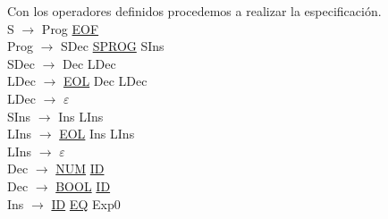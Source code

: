 \documentclass[\main/MemoriaPL.tex]{subfiles}
\begin{document}
    \par
    Con los operadores definidos procedemos a realizar la especificación.\\
    \vspace{2mm}
    S $\rightarrow$ Prog \underline{EOF}\\
    Prog $\rightarrow$ SDec \underline{SPROG} SIns\\
    SDec $\rightarrow$ Dec LDec\\
    LDec $\rightarrow$ \underline{EOL} Dec LDec\\
    LDec $\rightarrow$ $\varepsilon$\\
    SIns $\rightarrow$ Ins LIns\\
    LIns $\rightarrow$ \underline{EOL} Ins LIns\\
    LIns $\rightarrow$ $\varepsilon$\\
    Dec $\rightarrow$ \underline{NUM} \underline{ID}\\
    Dec $\rightarrow$ \underline{BOOL} \underline{ID}\\
    Ins $\rightarrow$ \underline{ID} \underline{EQ} Exp0\\
    \vspace{2mm}
\end{document}

